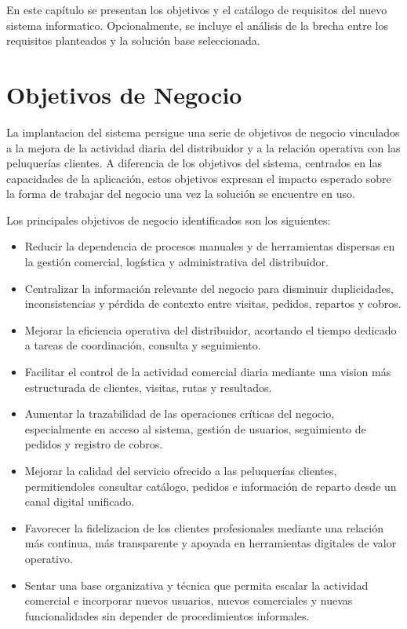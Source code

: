 
En este capítulo se presentan los objetivos y el catálogo de requisitos del nuevo sistema informatico. Opcionalmente, se incluye el análisis de la brecha entre los requisitos planteados y la solución base seleccionada.

\section{Objetivos de Negocio}
La implantacion del sistema persigue una serie de objetivos de negocio vinculados a la mejora de la actividad diaria del distribuidor y a la relación operativa con las peluquerías clientes. A diferencia de los objetivos del sistema, centrados en las capacidades de la aplicación, estos objetivos expresan el impacto esperado sobre la forma de trabajar del negocio una vez la solución se encuentre en uso.

Los principales objetivos de negocio identificados son los siguientes:

\begin{itemize}
    \item Reducir la dependencia de procesos manuales y de herramientas dispersas en la gestión comercial, logística y administrativa del distribuidor.
    \item Centralizar la información relevante del negocio para disminuir duplicidades, inconsistencias y pérdida de contexto entre visitas, pedidos, repartos y cobros.
    \item Mejorar la eficiencia operativa del distribuidor, acortando el tiempo dedicado a tareas de coordinación, consulta y seguimiento.
    \item Facilitar el control de la actividad comercial diaria mediante una vision más estructurada de clientes, visitas, rutas y resultados.
    \item Aumentar la trazabilidad de las operaciones críticas del negocio, especialmente en acceso al sistema, gestión de usuarios, seguimiento de pedidos y registro de cobros.
    \item Mejorar la calidad del servicio ofrecido a las peluquerías clientes, permitiendoles consultar catálogo, pedidos e información de reparto desde un canal digital unificado.
    \item Favorecer la fidelizacion de los clientes profesionales mediante una relación más continua, más transparente y apoyada en herramientas digitales de valor operativo.
    \item Sentar una base organizativa y técnica que permita escalar la actividad comercial e incorporar nuevos usuarios, nuevos comerciales y nuevas funcionalidades sin depender de procedimientos informales.
\end{itemize}

